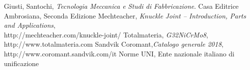 \documentclass{FR16}
\begin{document}
\newpage
\begin{thebibliography}{9}
Giusti, Santochi, \emph{Tecnologia Meccanica e Studi di Fabbricazione}. Casa Editrice Ambrosiana, Seconda Edizione
Mechteacher, \emph{Knuckle Joint – Introduction, Parts and Applications},\\ http://mechteacher.com/knuckle-joint/
Totalmateria, \emph{G32NiCrMo8}, http://www.totalmateria.com 
Sandvik Coromant,\emph{Catalogo  generale  2018},   http://www.coromant.sandvik.com/it
Norme UNI, Ente nazionale italiano di unificazione
\end{thebibliography}
\end{document}
